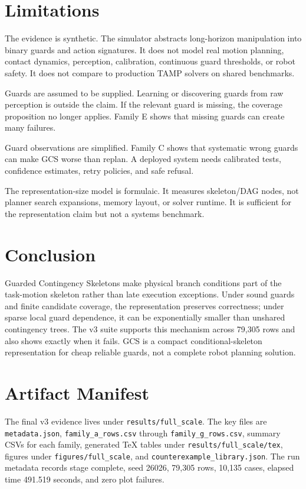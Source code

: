 \documentclass{article}
\begin{document}
\section{Limitations}
The evidence is synthetic. The simulator abstracts long-horizon manipulation into binary guards and action signatures. It does not model real motion planning, contact dynamics, perception, calibration, continuous guard thresholds, or robot safety. It does not compare to production TAMP solvers on shared benchmarks.

Guards are assumed to be supplied. Learning or discovering guards from raw perception is outside the claim. If the relevant guard is missing, the coverage proposition no longer applies. Family E shows that missing guards can create many failures.

Guard observations are simplified. Family C shows that systematic wrong guards can make GCS worse than replan. A deployed system needs calibrated tests, confidence estimates, retry policies, and safe refusal.

The representation-size model is formulaic. It measures skeleton/DAG nodes, not planner search expansions, memory layout, or solver runtime. It is sufficient for the representation claim but not a systems benchmark.

\section{Conclusion}
Guarded Contingency Skeletons make physical branch conditions part of the task-motion skeleton rather than late execution exceptions. Under sound guards and finite candidate coverage, the representation preserves correctness; under sparse local guard dependence, it can be exponentially smaller than unshared contingency trees. The v3 suite supports this mechanism across 79,305 rows and also shows exactly when it fails. GCS is a compact conditional-skeleton representation for cheap reliable guards, not a complete robot planning solution.




\appendix
\renewcommand{\thesection}{\arabic{section}}

\section{Artifact Manifest}
The final v3 evidence lives under \texttt{results/full\_scale}. The key files are \texttt{metadata.json}, \texttt{family\_a\_rows.csv} through \texttt{family\_g\_rows.csv}, summary CSVs for each family, generated TeX tables under \texttt{results/full\_scale/tex}, figures under \texttt{figures/full\_scale}, and \texttt{counterexample\_library.json}. The run metadata records stage complete, seed 26026, 79,305 rows, 10,135 cases, elapsed time 491.519 seconds, and zero plot failures.
\end{document}
